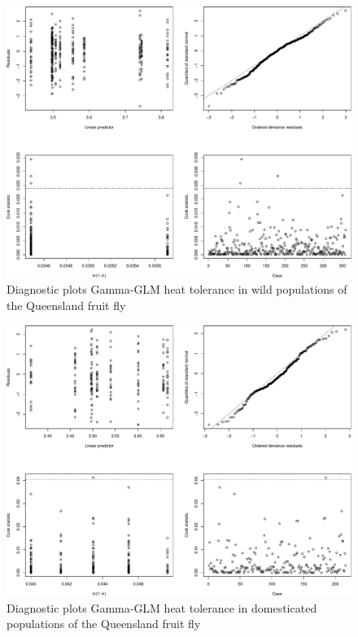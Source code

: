 \documentclass[]{article}
\begin{document}
\begin{figure}

{\centering \includegraphics{Supplementary_files/figure-latex/Diagnostic plots heat tolerance wild flies-1} 

}

\caption{Diagnostic plots Gamma-GLM heat tolerance in wild populations of the Queensland fruit fly}\label{fig:Diagnostic plots heat tolerance wild flies}
\end{figure}

\begin{figure}

{\centering \includegraphics{Supplementary_files/figure-latex/Diagnostic plots heat tolerance in domesticated flies-1} 

}

\caption{Diagnostic plots Gamma-GLM heat tolerance in domesticated populations of the Queensland fruit fly}\label{fig:Diagnostic plots heat tolerance in domesticated flies}
\end{figure}
\end{document}
